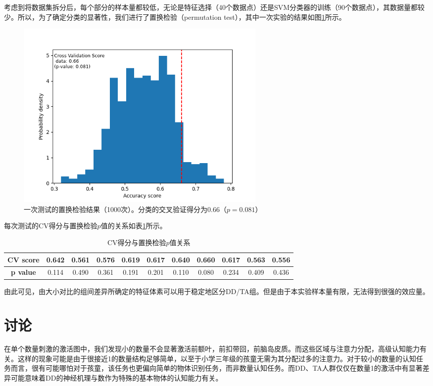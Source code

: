 \documentclass[bachelor, comfort]{shtthesis}
\begin{document}
考虑到将数据集拆分后，每个部分的样本量都较低，无论是特征选择（40个数据点）还是SVM分类器的训练（90个数据点），其数据量都较少。所以，为了确定分类的显著性，我们进行了置换检验（permutation test），其中一次实验的结果如图\ref{fig:6_svm_perm}所示。

\begin{figure}[ht]
	\centering
	\includegraphics[width=0.60\textwidth]{figures/6_svm_perm.png}
	\caption{\label{fig:6_svm_perm}一次测试的置换检验结果（1000次）。分类的交叉验证得分为0.66（$p=0.081$） }
\end{figure}

每次测试的CV得分与置换检验$p$值的关系如表\ref{tab:svm_p}所示。

\begin{table}[htbp]
	\centering
	\begin{tabular}{|c||c|c|c|c|c|c|c|c|c|c|}
		\hline

		\textbf{CV score} & 0.642 & 0.561 & 0.576 & 0.619 & 0.617 & 0.640 & 0.660 & 0.617 & 0.563 & 0.556 \\
		\hline

		\textbf{p value}  & 0.114 & 0.490 & 0.361 & 0.191 & 0.201 & 0.110 & 0.080 & 0.234 & 0.409 & 0.436 \\
		\hline
	\end{tabular}

	\caption{CV得分与置换检验$p$值关系}
	\label{tab:svm_p}
\end{table}


由此可见，由大小对比的组间差异所确定的特征体素可以用于稳定地区分DD/TA组。但是由于本实验样本量有限，无法得到很强的效应量。

\chapter{讨论} %
在单个数量刺激的激活图中，我们发现小的数量不会显著激活前额叶，前扣带回，前脑岛皮质。而这些区域与注意力分配，高级认知能力有关\cite{dis1}。这样的现象可能是由于很接近1的数量结构足够简单，以至于小学三年级的孩童无需为其分配过多的注意力。对于较小的数量的认知任务而言，很有可能哪怕对于孩童，该任务也更偏向简单的物体识别任务，而非数量认知任务。而DD、TA人群仅仅在数量1的激活中有显著差异可能意味着DD的神经机理与数作为特殊的基本物体的认知能力有关。
\end{document}
